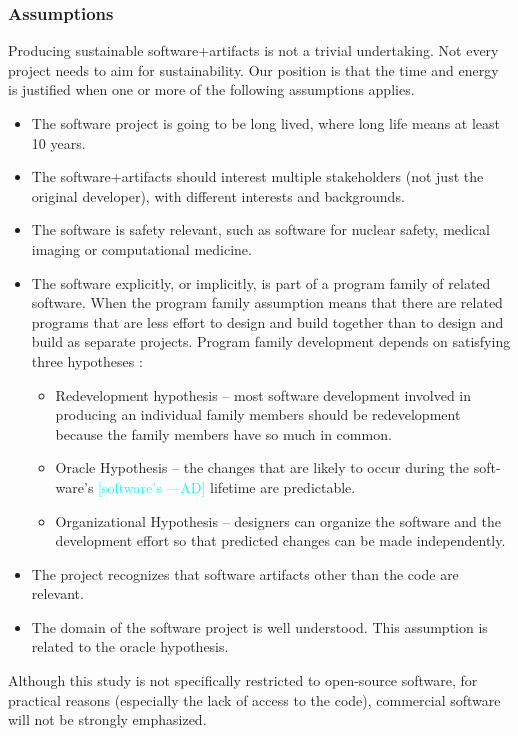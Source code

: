\documentclass[12pt]{article}
\newcommand{\authornote}[3]{\textcolor{#1}{[#3 ---#2]}}
\newcommand{\authornote}[3]{}
\newcommand{\ad}[1]{\authornote{cyan}{AD}{#1}} %
\begin{document}
\subsubsection*{Assumptions}

Producing sustainable software+artifacts is not a trivial undertaking.  Not
every project needs to aim for sustainability.  Our position is that the time
and energy is justified when one or more of the following assumptions applies.

\begin{itemize}
\item The software project is going to be long lived, where long life means at
  least 10 years.
\item The software+artifacts should interest multiple stakeholders (not just the
  original developer), with different interests and backgrounds.
\item The software is safety relevant, such as software for nuclear safety,
  medical imaging or computational medicine.
\item The software explicitly, or implicitly, is part of a program family of
  related software.  When the program family assumption means that there are
  related programs that are less effort to design and build together than to
  design and build as separate projects.  Program family development depends on
  satisfying three hypotheses \citep{Weiss1997}:
\begin{itemize}
\item Redevelopment hypothesis – most software development involved in producing
  an individual family members should be redevelopment because the family
  members have so much in common.
\item Oracle Hypothesis – the changes that are likely to occur during the soft-
  ware’s \ad{software's} lifetime are predictable.
\item Organizational Hypothesis – designers can organize the software and the
  development effort so that predicted changes can be made independently.
\end{itemize}
\item The project recognizes that software artifacts other than the code are
  relevant.
\item The domain of the software project is well understood.  This assumption is
  related to the oracle hypothesis.
\end{itemize}

Although this study is not specifically restricted to open-source software, for
practical reasons (especially the lack of access to the code), commercial
software will not be strongly emphasized.
\end{document}
